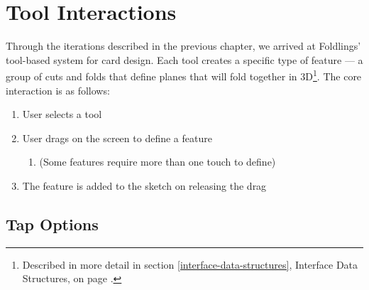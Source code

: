 \section{Tool Interactions}\label{tool-interactions}

Through the iterations described in the previous chapter, we arrived at
Foldlings' tool-based system for card design. Each tool creates a
specific type of feature --- a group of cuts and folds that define
planes that will fold together in 3D\footnote{Described in more detail
  in section \ref{interface-data-structures}, Interface Data Structures,
  on page \pageref{interface-data-structures}.}. The core interaction is
as follows:

\begin{enumerate}
\def\labelenumi{\arabic{enumi}.}
\itemsep1pt\parskip0pt
\item
  User selects a tool
\item
  User drags on the screen to define a feature

  \begin{enumerate}
  \def\labelenumii{\alph{enumii}.}
  \itemsep1pt\parskip0pt
  \item
    (Some features require more than one touch to define)
  \end{enumerate}
\item
  The feature is added to the sketch on releasing the drag
\end{enumerate}

\subsection{Tap Options}\label{tap-options}

